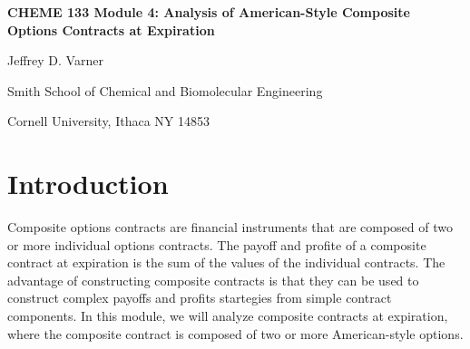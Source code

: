 \documentclass[11pt]{article}
\theoremstyle{definition}
\begin{document}
{\par\centering\textbf{\Large CHEME 133 Module 4: Analysis of American-Style Composite Options Contracts at Expiration}}
\vspace{0.2in}
{\par \centering \large{Jeffrey D. Varner}}
\vspace{0.05in}
{\par \centering \large{Smith School of Chemical and Biomolecular Engineering}}
{\par \centering \large{Cornell University, Ithaca NY 14853}}

\date{}
\thispagestyle{empty}

\setcounter{page}{1}

\section*{Introduction}
Composite options contracts are financial instruments that are composed of two or more individual options contracts. 
The payoff and profite of a composite contract at expiration is the sum of the values of the individual contracts. 
The advantage of constructing composite contracts is that they can be used to construct complex payoffs and profits startegies 
from simple contract components. In this module, we will analyze composite contracts at expiration, 
where the composite contract is composed of two or more American-style options.
\end{document}
